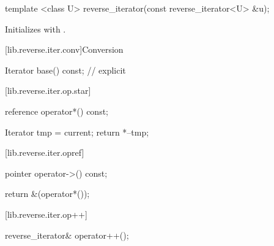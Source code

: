 %

\begin{itemdecl}
template <class U> reverse_iterator(const reverse_iterator<U> &u);
\end{itemdecl}

\begin{itemdescr}
\pnum
\effects
Initializes
with
.
\end{itemdescr}

[lib.reverse.iter.conv]{Conversion}

%
%
\begin{itemdecl}
Iterator base() const;          // explicit
\end{itemdecl}

\begin{itemdescr}
\pnum
\returns
{}
\end{itemdescr}

[lib.reverse.iter.op.star]{}

%
\begin{itemdecl}
reference operator*() const;
\end{itemdecl}

\begin{itemdescr}
\pnum
\effects
\begin{codeblock}
Iterator tmp = current;
return *--tmp;
\end{codeblock}
\end{itemdescr}

[lib.reverse.iter.opref]{}

%
\begin{itemdecl}
pointer operator->() const;
\end{itemdecl}

\begin{itemdescr}
\pnum
\effects
\begin{codeblock}
    return &(operator*());
\end{codeblock}
\end{itemdescr}

[lib.reverse.iter.op++]{}

%
\begin{itemdecl}
reverse_iterator& operator++();
\end{itemdecl}

